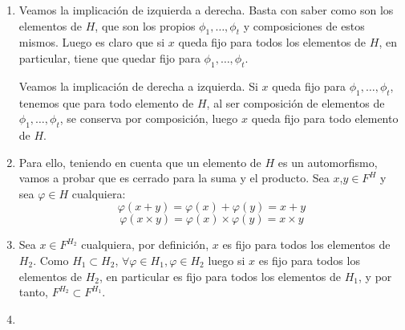 \documentclass[a4paper]{article}
\begin{document}
\begin{enumerate}
\item Veamos la implicación de izquierda a derecha. Basta con saber como son los elementos de $H$, que son los propios $\phi_1,\dots,\phi_t$ y composiciones de estos mismos. Luego es claro que si $x$ queda fijo para todos los elementos de $H$, en particular, tiene que quedar fijo para $\phi_1,\dots,\phi_t$.

Veamos la implicación de derecha a izquierda. Si $x$ queda fijo para $\phi_1,\dots,\phi_t$, tenemos que para todo elemento de $H$, al ser composición de elementos de $\phi_1,\dots,\phi_t$, se conserva por composición, luego $x$ queda fijo para todo elemento de $H$.

\item Para ello, teniendo en cuenta que un elemento de $H$ es un automorfismo, vamos a probar que es cerrado para la suma y el producto. Sea $x$,$y \in F^H$ y sea $\varphi \in H$ cualquiera:
\begin{equation*}
\varphi(x+y)=\varphi(x)+\varphi(y)=x+y
\end{equation*}
\begin{equation*}
\varphi(x \times y)=\varphi(x) \times \varphi(y)=x\times y
\end{equation*}

\item Sea $x \in F^{H_2}$ cualquiera, por definición, $x$ es fijo para todos los elementos de $H_2$. Como $H_1 \subset H_2$, $\forall \varphi \in H_1, \varphi \in H_2$ luego si $x$ es fijo para todos los elementos de $H_2$, en particular es fijo para todos los elementos de $H_1$, y por tanto, $F^{H_2}\subset F^{H_1}$.

\newpage

\item \



\end{enumerate}
\end{document}
